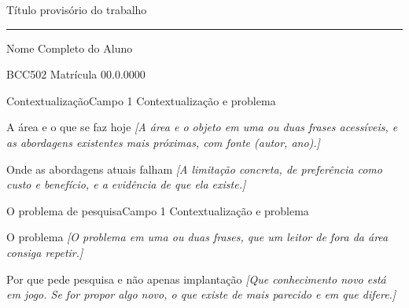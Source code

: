 \documentclass[aspectratio=169,11pt]{beamer}
\newcommand{\titulotrabalho}{Título provisório do trabalho}
\newcommand{\nomealuno}{Nome Completo do Aluno}
\newcommand{\matricula}{00.0.0000}
\newcommand{\preencher}[1]{\textcolor{mplace}{\textit{[#1]}}}
\begin{document}
\begin{frame}[plain,c]
  \relax
  {\titulotrabalho\par}
  \vskip 0.35cm
  \textcolor{maccent}{\rule{1.1cm}{1.5pt}}
  \vskip 0.5cm
  {\large \nomealuno\par}
  \vskip 0.15cm
  {\small\color{mgray} BCC502 \textperiodcentered{} Matrícula \matricula\par}
\end{frame}
\setcounter{framenumber}{0}


\begin{frame}[t]{Contextualização}{Campo 1 \textperiodcentered{} Contextualização e problema}
  \begin{bloco}{A área e o que se faz hoje}
    \preencher{A área e o objeto em uma ou duas frases acessíveis, e as abordagens existentes mais próximas, com fonte (autor, ano).}
  \end{bloco}

  \begin{bloco}{Onde as abordagens atuais falham}
    \preencher{A limitação concreta, de preferência como custo e benefício, e a evidência de que ela existe.}
  \end{bloco}
\end{frame}

\begin{frame}[t]{O problema de pesquisa}{Campo 1 \textperiodcentered{} Contextualização e problema}
  \begin{bloco}{O problema}
    \preencher{O problema em uma ou duas frases, que um leitor de fora da área consiga repetir.}
  \end{bloco}

  \begin{bloco}{Por que pede pesquisa e não apenas implantação}
    \preencher{Que conhecimento novo está em jogo. Se for propor algo novo, o que existe de mais parecido e em que difere.}
  \end{bloco}
\end{frame}
\end{document}
